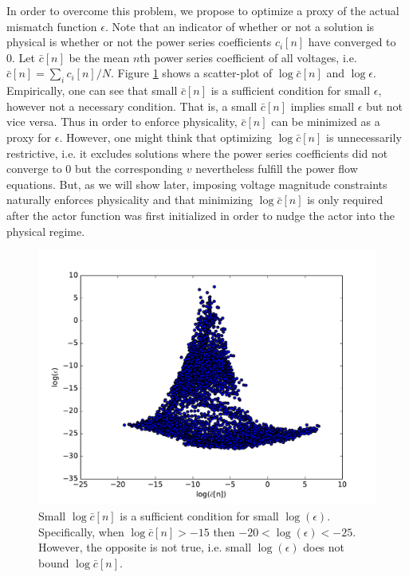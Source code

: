 In order to overcome this problem, we propose to optimize a proxy of the actual mismatch function $\epsilon$. Note that an indicator of whether or not a solution is physical is whether or not the power series coefficients $c_i[n]$ have converged to 0. Let $\bar{c}[n]$ be the mean $n$th power series coefficient of all voltages, i.e. $\bar{c}[n] = \sum_i c_i[n]/N$. Figure \ref{fig:ceps} shows a scatter-plot of $\log \bar{c}[n]$ and $\log \epsilon$. Empirically, one can see that small $\bar{c}[n]$ is a sufficient condition for small $\epsilon$, however not a necessary condition. That is, a small $\bar{c}[n]$ implies small $\epsilon$ but not vice versa. Thus in order to enforce physicality, $\bar{c}[n]$ can be minimized as a proxy for $ \epsilon$. However, one might think that optimizing $\log \bar{c}[n]$ is unnecessarily restrictive, i.e. it excludes solutions where the power series coefficients did not converge to 0 but the corresponding $v$ nevertheless fulfill the power flow equations. But, as we will show later, imposing voltage magnitude constraints naturally enforces physicality and that minimizing $\log \bar{c}[n]$ is only required after the actor function was first initialized in order to nudge the actor into the physical regime.


\begin{figure}
\includegraphics[width=\linewidth]{krtofl/ceps.pdf}
\caption{Small $\log \bar{c}[n]$ is a sufficient condition for small $\log(\epsilon)$. Specifically, when $\log \bar{c}[n] > -15$ then $-20 < \log(\epsilon) < -25$. However, the opposite is not true, i.e. small $\log(\epsilon)$ does not bound $\log \bar{c}[n]$.}
\label{fig:ceps}
\end{figure}


